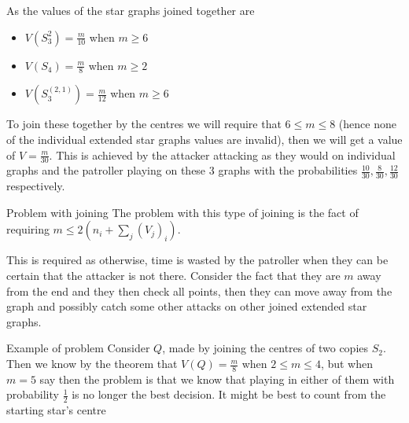\documentclass[12pt]{beamer}
\begin{document}
\begin{frame}{}
As the values of the star graphs joined together are
\begin{itemize}
\item $V(S_{3}^{2})=\frac{m}{10}$ when $m \geq 6$
\item $V(S_{4})=\frac{m}{8}$ when $m \geq 2$
\item $V(S_{3}^{(2,1)})=\frac{m}{12}$ when $m \geq 6$
\end{itemize}
To join these together by the centres we will require that $6 \leq m \leq 8$ (hence none of the individual extended star graphs values are invalid), then we will get a value of $V=\frac{m}{30}$. This is achieved by the attacker attacking as they would on individual graphs and the patroller playing on these 3 graphs with the probabilities $\frac{10}{30},\frac{8}{30},\frac{12}{30}$ respectively.
\end{frame}

\begin{frame}{Problem with joining}
The problem with this type of joining is the fact of requiring $m \leq 2\left(n_{i}+\sum\limits_{j} (V_{j})_{i}\right)$.

This is required as otherwise, time is wasted by the patroller when they can be certain that the attacker is not there. Consider the fact that they are $m$ away from the end and they then check all points, then they can move away from the graph and possibly catch some other attacks on other joined extended star graphs.
\end{frame}

\begin{frame}{Example of problem}
Consider $Q$, made by joining the centres of two copies $S_{2}$. Then we know by the theorem that $V(Q)=\frac{m}{8}$ when $2 \leq m \leq 4$, but when $m=5$ say then the problem is that we know that playing in either of them with probability $\frac{1}{2}$ is no longer the best decision. It might be best to count from the starting star's centre
\end{frame}
\end{document}
